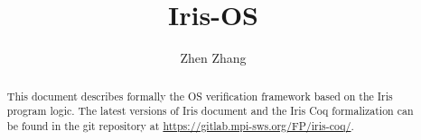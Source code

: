 \documentclass[10pt]{article}
\title{\bfseries Iris-OS}
\author{Zhen Zhang}
\begin{document}
\maketitle
\thispagestyle{empty}
\vfill
\begin{abstract}
This document describes formally the OS verification framework based on the Iris program logic.
The latest versions of Iris document and the Iris Coq formalization can be found in the git repository at \url{https://gitlab.mpi-sws.org/FP/iris-coq/}.
\end{abstract}

\clearpage
\tableofcontents
\clearpage

\begingroup

\endgroup
\clearpage

\begingroup

\endgroup
\clearpage

\begingroup

\endgroup
\clearpage

\begingroup

\endgroup
\clearpage

\printbibliography
\end{document}
